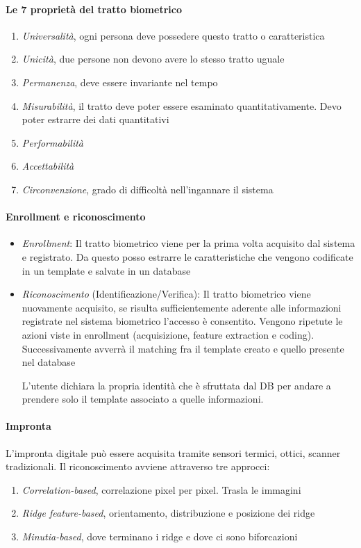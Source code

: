 \paragraph{Le 7 proprietà del tratto biometrico}
\begin{enumerate}
    \item \textit{Universalità}, ogni persona deve possedere questo tratto o caratteristica
    \item \textit{Unicità}, due persone non devono avere lo stesso tratto uguale
    \item \textit{Permanenza}, deve essere invariante nel tempo
    \item \textit{Misurabilità}, il tratto deve poter essere esaminato quantitativamente. Devo poter estrarre dei dati quantitativi
    \item \textit{Performabilità}
    \item \textit{Accettabilità}
    \item \textit{Circonvenzione}, grado di difficoltà nell’ingannare il sistema
\end{enumerate}

\paragraph{Enrollment e riconoscimento}
\begin{itemize}
    \item \textit{Enrollment}: Il tratto biometrico viene per la prima volta acquisito dal sistema e registrato. Da questo posso estrarre le caratteristiche che vengono codificate in un template e salvate in un database
    \item \textit{Riconoscimento} (Identificazione/Verifica): Il tratto biometrico viene nuovamente acquisito, se risulta sufficientemente aderente alle informazioni registrate nel sistema biometrico l’accesso è consentito. Vengono ripetute le azioni viste in enrollment (acquisizione, feature extraction e coding). Successivamente avverrà il matching fra il template creato e quello presente nel database

    L’utente dichiara la propria identità che è sfruttata dal DB per andare a prendere solo il template associato a quelle informazioni.
\end{itemize}

\paragraph{Impronta}
L’impronta digitale può essere acquisita tramite sensori termici, ottici, scanner tradizionali. Il riconoscimento avviene attraverso tre approcci:
\begin{enumerate}
    \item \textit{Correlation-based}, correlazione pixel per pixel. Trasla le immagini
    \item \textit{Ridge feature-based}, orientamento, distribuzione e posizione dei ridge
    \item \textit{Minutia-based}, dove terminano i ridge e dove ci sono biforcazioni
\end{enumerate}

